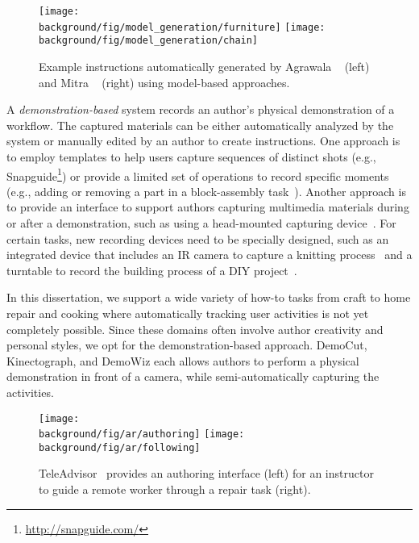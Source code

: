\begin{figure*}[t!]
  \centering
  \texttt{[image: \\background/fig/model\_generation/furniture]}
  \texttt{[image: \\background/fig/model\_generation/chain]}
  \caption{Example instructions automatically generated by Agrawala \ea~\cite{agrawala2003designing} (left) and Mitra \ea~\cite{mitra2010illustrating} (right) using model-based approaches.}
  \label{fig:related_models}
\end{figure*}

A \emph{demonstration-based} system records an author's physical demonstration of a workflow. The captured materials can be either automatically analyzed by the system or manually edited by an author to create instructions.
%
One approach is to employ templates to help users capture sequences of distinct shots (e.g., Snapguide\footnote{\url{http://snapguide.com/}}) or provide a limited set of operations to record specific moments (e.g., adding or removing a part in a block-assembly task~\cite{Ranjan:2007,Gupta2012DuploTrack}).
%
Another approach is to provide an interface to support authors capturing multimedia materials during or after a demonstration, such as using a head-mounted capturing device~\cite{carter2015authoring}. For certain tasks, new recording devices need to be specially designed, such as an integrated device that includes an IR camera to capture a knitting process~\cite{Rosner:2008:SAK:1409635.1409682} and a turntable to record the building process of a DIY project~\cite{Tseng:2015:SPT:2771839.2771869}.

In this dissertation, we support a wide variety of how-to tasks from craft to home repair and cooking where automatically tracking user activities is not yet completely possible. Since these domains often involve author creativity and personal styles, we opt for the demonstration-based approach.
%
DemoCut, Kinectograph, and DemoWiz each allows authors to perform a physical demonstration in front of a camera, while semi-automatically capturing the activities.


\begin{figure*}[t!]
  \centering
  \texttt{[image: \\background/fig/ar/authoring]}
  \texttt{[image: \\background/fig/ar/following]}
  \caption{TeleAdvisor~\cite{Gurevich:2012ko} provides an authoring interface (left) for an instructor to guide a remote worker through a repair task (right).}
  \label{fig:related_teleadvisor}
\end{figure*}

